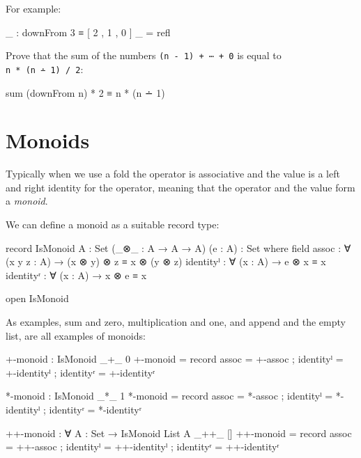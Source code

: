 For example:

\begin{fence}
\begin{code}
_ : downFrom 3 ≡ [ 2 , 1 , 0 ]
_ = refl
\end{code}
\end{fence}

Prove that the sum of the numbers \texttt{(n\ -\ 1)\ +\ ⋯\ +\ 0} is
equal to \texttt{n\ *\ (n\ ∸\ 1)\ /\ 2}:

\begin{myDisplay}
sum (downFrom n) * 2 ≡ n * (n ∸ 1)
\end{myDisplay}

\hypertarget{monoids}{%
\section{Monoids}\label{monoids}}

Typically when we use a fold the operator is associative and the value
is a left and right identity for the operator, meaning that the operator
and the value form a \emph{monoid}.

We can define a monoid as a suitable record type:

\begin{fence}
\begin{code}
record IsMonoid {A : Set} (_⊗_ : A → A → A) (e : A) : Set where
  field
    assoc : ∀ (x y z : A) → (x ⊗ y) ⊗ z ≡ x ⊗ (y ⊗ z)
    identityˡ : ∀ (x : A) → e ⊗ x ≡ x
    identityʳ : ∀ (x : A) → x ⊗ e ≡ x

open IsMonoid
\end{code}
\end{fence}

As examples, sum and zero, multiplication and one, and append and the
empty list, are all examples of monoids:

\begin{fence}
\begin{code}
+-monoid : IsMonoid _+_ 0
+-monoid =
  record
    { assoc = +-assoc
    ; identityˡ = +-identityˡ
    ; identityʳ = +-identityʳ
    }

*-monoid : IsMonoid _*_ 1
*-monoid =
  record
    { assoc = *-assoc
    ; identityˡ = *-identityˡ
    ; identityʳ = *-identityʳ
    }

++-monoid : ∀ {A : Set} → IsMonoid {List A} _++_ []
++-monoid =
  record
    { assoc = ++-assoc
    ; identityˡ = ++-identityˡ
    ; identityʳ = ++-identityʳ
    }
\end{code}
\end{fence}

